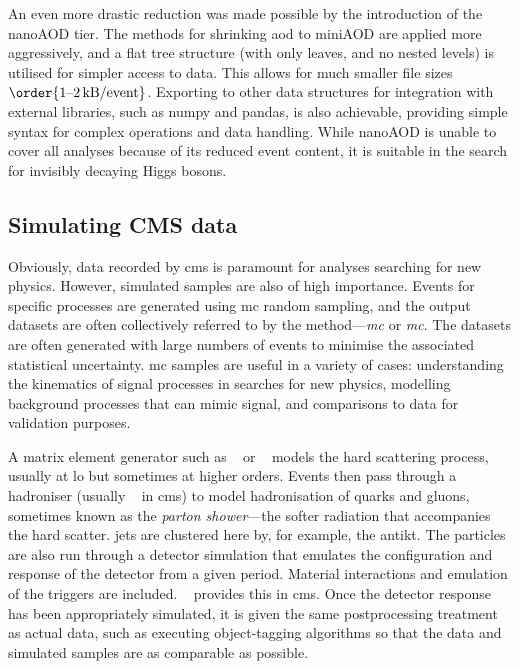 An even more drastic reduction was made possible by the introduction of the nanoAOD tier. The methods for shrinking \acrshort{aod} to miniAOD are applied more aggressively, and a flat tree structure (with only leaves, and no nested levels) is utilised for simpler access to data. This allows for much smaller file sizes $\order{\text{1--2\,kB}/\text{event}}$. Exporting to other data structures for integration with external libraries, such as \textsf{numpy} and \textsf{pandas}, is also achievable, providing simple syntax for complex operations and data handling. While nanoAOD is unable to cover all analyses because of its reduced event content, it is suitable in the search for invisibly decaying Higgs bosons.




\subsection{Simulating CMS data}
\label{subsec:cms_mc}

Obviously, data recorded by \acrshort{cms} is paramount for analyses searching for new physics. However, simulated samples are also of high importance. Events for specific processes are generated using \acrfull{mc} random sampling, and the output datasets are often collectively referred to by the method---\emph{\acrlong{mc}} or \emph{\acrshort{mc}}. The datasets are often generated with large numbers of events to minimise the associated statistical uncertainty. \acrshort{mc} samples are useful in a variety of cases: understanding the kinematics of signal processes in searches for new physics, modelling background processes that can mimic signal, and comparisons to data for validation purposes.

A matrix element generator such as \madgraph~\cite{Alwall:2014hca} or \POWHEG~\cite{Nason:2004rx,Frixione:2007vw} models the hard scattering process, usually at \acrfull{lo} but sometimes at higher orders. Events then pass through a hadroniser (usually \PYTHIA~\cite{pythia82} in \acrshort{cms}) to model hadronisation of quarks and gluons, sometimes known as the \emph{parton shower}---the softer radiation that accompanies the hard scatter. \Glspl{jet} are clustered here by, for example, the \gls{antikt}. The particles are also run through a detector simulation that emulates the configuration and response of the detector from a given period. Material interactions and emulation of the triggers are included. \GEANTfour~\cite{AGOSTINELLI2003250} provides this in \acrshort{cms}. Once the detector response has been appropriately simulated, it is given the same postprocessing treatment as actual data, such as executing object-tagging algorithms so that the data and simulated samples are as comparable as possible.


